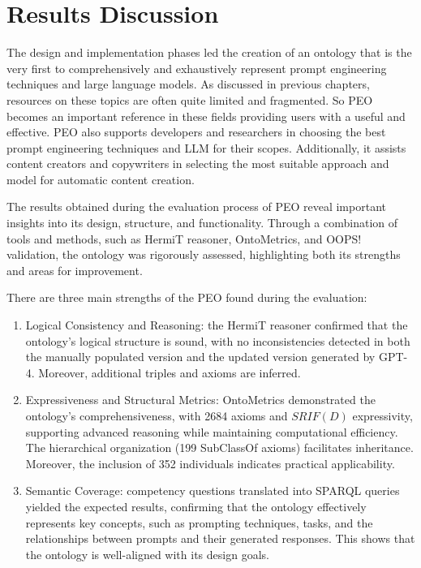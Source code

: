 \newpage
\section{Results Discussion}
\label{section:5_6_discussion}
The design and implementation phases led the creation of an ontology that is the very first to comprehensively and exhaustively represent prompt engineering techniques and large language models.
As discussed in previous chapters, resources on these topics are often quite limited and fragmented.
So PEO becomes an important reference in these fields providing users with a useful and effective. PEO also supports developers and researchers in choosing the best prompt engineering techniques and LLM for their scopes. Additionally, it assists content creators and copywriters in selecting the most suitable approach and model for automatic content creation.

The results obtained during the evaluation process of PEO reveal important insights into its design, structure, and functionality.
Through a combination of tools and methods, such as HermiT reasoner, OntoMetrics, and OOPS! validation, the ontology was rigorously assessed, highlighting both its strengths and areas for improvement.

There are three main strengths of the PEO found during the evaluation:
\begin{enumerate}
    \item Logical Consistency and Reasoning: the HermiT reasoner confirmed that the ontology's logical structure is sound, with no inconsistencies detected in both the manually populated version and the updated version generated by GPT-4. Moreover, additional triples and axioms are inferred. 

    \item Expressiveness and Structural Metrics: OntoMetrics demonstrated the ontology’s comprehensiveness, with 2684 axioms and $SRIF(D)$ expressivity, supporting advanced reasoning while maintaining computational efficiency. The hierarchical organization (199 SubClassOf axioms) facilitates inheritance.
    Moreover, the inclusion of 352 individuals indicates practical applicability.

    \item Semantic Coverage: competency questions translated into SPARQL queries yielded the expected results, confirming that the ontology effectively represents key concepts, such as prompting techniques, tasks, and the relationships between prompts and their generated responses. This shows that the ontology is well-aligned with its design goals.
\end{enumerate}

